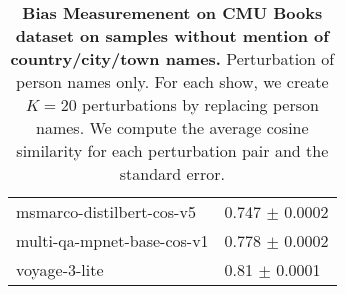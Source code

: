 \begin{table}[h!]
{\begin{tabular}{ll}
            msmarco-distilbert-cos-v5 &                 0.747 $\pm$ 0.0002 \\
           multi-qa-mpnet-base-cos-v1 &                 0.778 $\pm$ 0.0002 \\
                        voyage-3-lite &                  0.81 $\pm$ 0.0001 \\
\bottomrule
\end{tabular}}
\caption{\textbf{Bias Measuremenent on CMU Books dataset on samples without mention of country/city/town names.} Perturbation  of person names only. For each show, we create $K{=}20$ perturbations by
replacing person names. We compute the average cosine similarity for each perturbation pair and the standard error.\label{tab:cmu_book_no_location_only_person_replace}}
\end{table}




